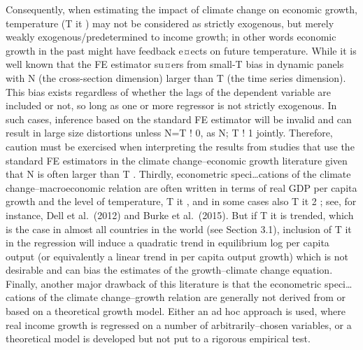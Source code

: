 \documentclass[
]{book}
\begin{document}
Consequently, when estimating the
impact of climate change on economic growth, temperature (T it ) may not be considered
as strictly exogenous, but merely weakly exogenous/predetermined to income growth; in
other words economic growth in the past might have feedback e¤ects on future temperature.
While it is well known that the FE estimator su¤ers from small-T bias in dynamic panels
with N (the cross-section dimension) larger than T (the time series dimension).
This bias exists regardless of whether the lags of the dependent
variable are included or not, so long as one or more regressor is not strictly exogenous.
In such cases, inference based on the standard FE estimator will be invalid and can result in
large size distortions unless N=T ! 0, as N; T ! 1 jointly. Therefore, caution must be
exercised when interpreting the results from studies that use the standard FE estimators in
the climate change--economic growth literature given that N is often larger than T .
Thirdly, econometric speci\ldots cations of the climate change--macroeconomic relation are
often written in terms of real GDP per capita growth and the level of temperature, T it , and
in some cases also T it 2 ; see, for instance, Dell et al.~(2012) and Burke et al.~(2015). But if T it
is trended, which is the case in almost all countries in the world (see Section 3.1), inclusion
of T it in the regression will induce a quadratic trend in equilibrium log per capita output (or
equivalently a linear trend in per capita output growth) which is not desirable and can bias
the estimates of the growth--climate change equation. Finally, another major drawback of
this literature is that the econometric speci\ldots cations of the climate change--growth relation
are generally not derived from or based on a theoretical growth model. Either an ad hoc
approach is used, where real income growth is regressed on a number of arbitrarily--chosen
variables, or a theoretical model is developed but not put to a rigorous empirical test.
\end{document}
